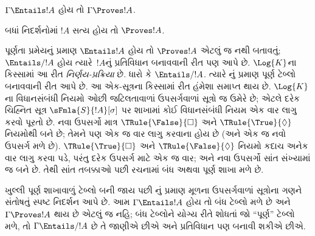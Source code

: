 \begin{cor}
$\Gamma \Entails !A$ હોય તો $\Gamma \Proves !A$.
\end{cor}

\begin{cor}
બધાં નિદર્શનોમાં $!A$ સત્ય હોય તો $\Proves !A$.
\end{cor}
\endgroup

\begingroup
\makeatletter{}\makeatother

      
\label{guunit:OLP-0469}


\begin{explain}
  પૂર્ણતા પ્રમેયનું પ્રમાણ $\Entails !A$ હોય તો $\Proves !A$
  એટલું જ નથી બતાવતું; $\Entails/ !A$ હોય ત્યારે~$!A$નું
  પ્રતિવિધાન બનાવવાની રીત પણ આપે છે.
  $\Log{K}$ના કિસ્સામાં આ રીત \emph{નિર્ણય-પ્રક્રિયા} છે.
  ધારો કે $\Entails/ !A$. ત્યારે
  નું પ્રમાણ પૂર્ણ
  ટેબ્લો બનાવવાની રીત આપે છે. આ એક-સૂત્રના કિસ્સામાં
  રીત હંમેશા સમાપ્ત થાય છે. $\Log{K}$ના વિધાનસંબંધી નિયમો
  ઓછી જટિલતાવાળાં ઉપસર્ગવાળાં સૂત્રો જ ઉમેરે છે;
  એટલે દરેક ચિહ્નિત સૂત્ર $\sFmla{S}{!A}[\sigma]$ પર
  શાખામાં કોઈ વિધાનસંબંધી નિયમ એક વાર લાગુ કરવો પૂરતો છે.
  નવા ઉપસર્ગો માત્ર
  $\TRule{\False}{\Box}$
    અને $\TRule{\True}{\Diamond}$
  નિયમોથી બને છે; તેમને
  પણ એક જ વાર લાગુ કરવાના હોય છે (અને એક જ નવો ઉપસર્ગ મળે છે).
  $\TRule{\True}{\Box}$
    અને $\TRule{\False}{\Diamond}$
  નિયમો કદાચ અનેક વાર
  લાગુ કરવા પડે, પરંતુ દરેક ઉપસર્ગ માટે એક જ વાર; અને નવા
  ઉપસર્ગો સાંત સંખ્યામાં જ બને છે. તેથી સાંત તબક્કાઓ પછી
  રચનામાં બંધ અથવા પૂર્ણ શાખા મળે છે.

  ખુલ્લી પૂર્ણ શાખાવાળું ટેબ્લો બની જાય પછી
  નું પ્રમાણ મૂળના
  ઉપસર્ગવાળાં સૂત્રોના ગણને સંતોષતું સ્પષ્ટ નિદર્શન
  આપે છે. આમ $\Gamma \Entails !A$ હોય તો બંધ ટેબ્લો
  મળે છે અને $\Gamma \Proves !A$ થાય છે એટલું જ નહિ;
  બંધ ટેબ્લોને યોગ્ય રીતે શોધતાં જો ``પૂર્ણ''
  ટેબ્લો મળે, તો $\Gamma \Entails/ !A$ છે તે જાણીએ
  છીએ અને પ્રતિવિધાન પણ બનાવી શકીએ છીએ.
\end{explain}

